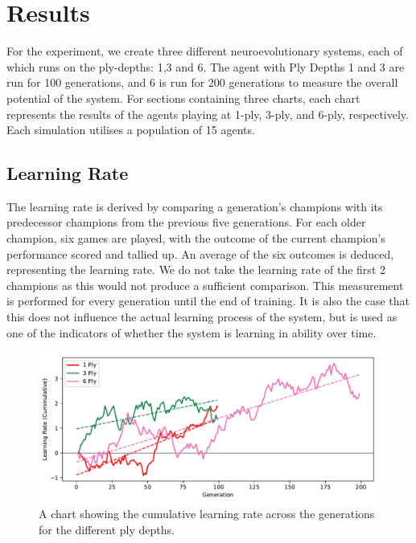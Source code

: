 \documentclass[12pt,a4paper]{article}
\begin{document}
\section{Results}
    

    For the experiment, we create three different neuroevolutionary systems, each of which runs on the ply-depths: 1,3 and 6. The agent with Ply Depths 1 and 3 are run for 100 generations, and 6 is run for 200 generations to measure the overall potential of the system. For sections containing three charts, each chart represents the results of the agents playing at 1-ply, 3-ply, and 6-ply, respectively. Each simulation utilises a population of 15 agents.

    \subsection{Learning Rate}
    
    The learning rate is derived by comparing a generation's champions with its predecessor  champions from the previous five generations. For each older champion, six games are played, with the outcome of the current champion's performance scored and tallied up. An average of the six outcomes is deduced, representing the learning rate. We do not take the learning rate of the first 2 champions as this would not produce a sufficient comparison. This measurement is performed for every generation until the end of training. It is also the case that this does not influence the actual learning process of the system, but is used as one of the indicators of whether the system is learning in ability over time.
    
    \begin{figure}[!ht]
        \centering
        \includegraphics[width=160mm]{images/results/combined_cummulative.pdf}
        \caption{A chart showing the cumulative learning rate across the generations for the different ply depths.\label{cum_growth}}
    \end{figure}
    
\end{document}
